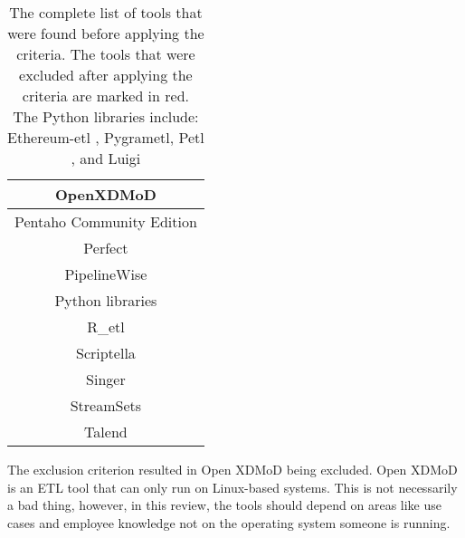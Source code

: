 \documentclass[11pt]{article}
\begin{document}
\begin{table}[H]
\begin{tabular}{|c|}
        {\color[HTML]{FE0000} OpenXDMoD \cite{Dean2022}} \\ \hline
        Pentaho Community Edition \cite{Sreemathy20211650, Fang2022, Zheng2023} \\ \hline
        Perfect \\ \hline
        PipelineWise \\ \hline
        Python libraries\text{*} \cite{Fissore2018267} \\ \hline
        R\_etl \cite{Biswas_programming2019267, Biswas_realtime202053} \\ \hline
        {\color[HTML]{FE0000} Scriptella \cite{Biswas_programming2019267, Biswas_realtime202053}} \\ \hline
        Singer\\ \hline
        {\color[HTML]{FE0000} StreamSets \cite{Sreemathy20211650}} \\ \hline
        {\color[HTML]{FE0000} Talend \cite{Espinoza2023, Sreemathy20211650}} \\ \hline
    \end{tabular}
    \caption{The complete list of tools that were found before applying the criteria. The tools that were excluded after applying the criteria are marked in red. \\
    \text{*}The Python libraries include: Ethereum-etl \cite{Camozzi2022}, Pygrametl\cite{Thomsen201821, Jensen202145, Biswas_programming2019267, Biswas_realtime202053}, Petl \cite{Biswas_programming2019267, Biswas_realtime202053}, and Luigi}
\label{table:tools}
\end{table}

The exclusion criterion resulted in Open XDMoD being excluded. Open XDMoD is an ETL tool that can only run on Linux-based systems. This is not necessarily a bad thing, however, in this review, the tools should depend on areas like use cases and employee knowledge not on the operating system someone is running. \\
\end{document}
